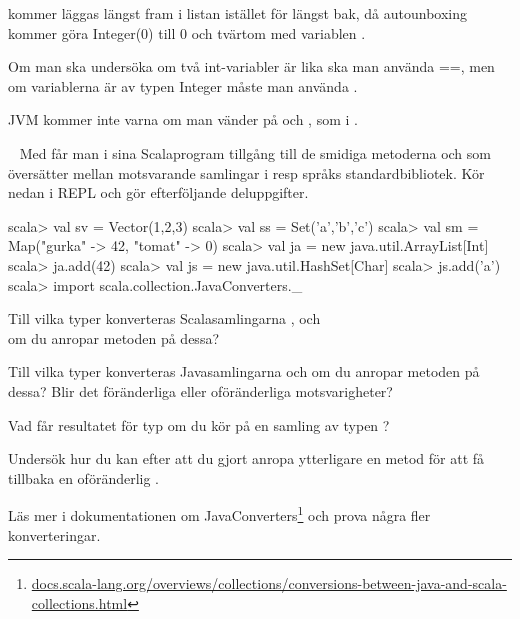 \SubtaskSolved   {}

 kommer läggas längst fram i listan istället för längst bak, då autounboxing kommer göra Integer(0) till 0 och tvärtom med variablen .

\SubtaskSolved   Om man ska undersöka om två int-variabler är lika ska man använda ==, men om variablerna är av typen Integer måste man använda .

JVM kommer inte varna om man vänder på  och , som i .



\QUESTEND







\QUESTBEGIN

\Task  \what~  Med  får man i sina Scalaprogram tillgång till de smidiga metoderna  och  som översätter mellan motsvarande samlingar i resp språks standardbibliotek. Kör nedan i REPL och gör efterföljande deluppgifter.

\begin{REPL}
scala> val sv = Vector(1,2,3)
scala> val ss = Set('a','b','c')
scala> val sm = Map("gurka" -> 42, "tomat" -> 0)
scala> val ja = new java.util.ArrayList[Int]
scala> ja.add(42)
scala> val js = new java.util.HashSet[Char]
scala> js.add('a')
scala> import scala.collection.JavaConverters._
\end{REPL}

\Subtask Till vilka typer konverteras Scalasamlingarna
,  och \\  om du anropar metoden  på dessa?

\Subtask Till vilka typer konverteras Javasamlingarna  och   om du anropar metoden  på dessa? Blir det föränderliga eller oföränderliga motsvarigheter?

\Subtask Vad får resultatet för typ om du kör  på en samling av typen ?

\Subtask Undersök hur du kan efter att du gjort  anropa ytterligare en metod för att få tillbaka en oföränderlig .

\Subtask Läs mer i dokumentationen om JavaConverters\footnote{\href{http://docs.scala-lang.org/overviews/collections/conversions-between-java-and-scala-collections.html}{docs.scala-lang.org/overviews/collections/conversions-between-java-and-scala-collections.html}}
och prova några fler konverteringar.



